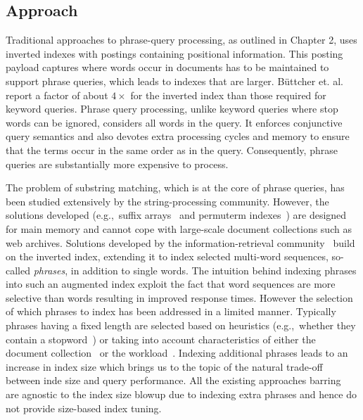 \subsection{Approach}
Traditional approaches to phrase-query processing, as outlined in Chapter 2, uses inverted indexes with postings containing positional information. This posting payload captures where words occur in documents has to be maintained to support phrase queries, which leads to indexes that are larger. B\"uttcher et. al.~\cite{Buttcher:2010fk} report a factor of about $4\times$ for the inverted index than those required for keyword queries. Phrase query processing, unlike keyword queries where stop words can be ignored, considers all words in the query. It enforces conjunctive query semantics and also devotes extra processing cycles and memory to ensure that the terms occur in the same order as in the query. Consequently, phrase queries are substantially more expensive to process.


The problem of substring matching, which is at the core of phrase
queries, has been studied extensively by the string-processing
community. However, the solutions developed (e.g.,~suffix
arrays~\cite{Manber:1993vn} and permuterm
indexes~\cite{Ferragina:2010bh}) are designed for main memory and
cannot cope with large-scale document collections such as web archives. Solutions developed
by the infor\-ma\-tion-re\-trie\-val
community~\cite{Transier:2008kx,Williams:2004fk} build on the inverted
index, extending it to index selected multi-word sequences, so-called
\emph{phrases}, in addition to single words. The intuition behind indexing phrases into such an augmented index exploit the fact that word sequences are more selective than words resulting in improved response times. However the selection of which phrases to index has been addressed in a limited manner. Typically phrases having a fixed length are selected based on
heuristics (e.g.,~whether they contain a
stopword~\cite{Chang:2008kx,Williams:2004fk}) or taking into account
characteristics of either the document
collection~\cite{Transier:2008kx} or the workload~\cite{Williams:2004fk}. Indexing additional phrases leads to an increase in index size which brings us to the topic of the natural trade-off between inde size and query performance. All the existing approaches barring~\cite{Transier:2008kx} are agnostic to the index size blowup due to indexing extra phrases and hence do not provide size-based index tuning. 

